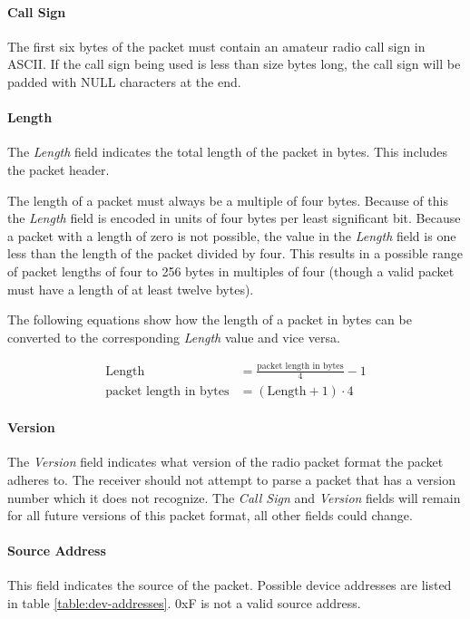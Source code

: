 \paragraph{Call Sign}
The first six bytes of the packet must contain an amateur radio call sign in ASCII. If the call sign being used is less
than size bytes long, the call sign will be padded with NULL characters at the end.

\paragraph{Length}
The \emph{Length} field indicates the total length of the packet in bytes. This includes the packet header.

The length of a packet must always be a multiple of four bytes. Because of this the \emph{Length} field is encoded in
units of four bytes per least significant bit. Because a packet with a length of zero is not possible, the value in the
\emph{Length} field is one less than the length of the packet divided by four. This results in a possible range of
packet lengths of four to 256 bytes in multiples of four (though a valid packet must have a length of at least twelve
bytes).

The following equations show how the length of a packet in bytes can be converted to the corresponding \emph{Length}
value and vice versa.

\begin{align*}
	\text{Length}                 & = \frac{\text{packet length in bytes}}{4} - 1 \\
	\text{packet length in bytes} & = \left(\text{Length} + 1\right) \cdot 4
\end{align*}

\paragraph{Version}
The \emph{Version} field indicates what version of the radio packet format the packet adheres to. The receiver should
not attempt to parse a packet that has a version number which it does not recognize. The \emph{Call Sign} and
\emph{Version} fields will remain for all future versions of this packet format, all other fields could change.

\paragraph{Source Address}
This field indicates the source of the packet. Possible device addresses are listed in table \ref{table:dev-addresses}.
0xF is not a valid source address.

